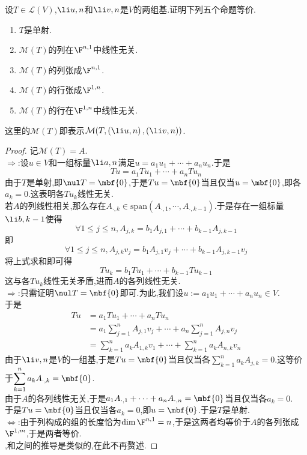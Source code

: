 \documentclass{ctexart}
\begin{document}
\begin{problem}[17.]
    设$T\in\mathcal{L}(V)$,$\li u,n$和$\li v,n$是$V$的两组基.证明下列五个命题等价.
    \begin{enumerate}[label=\tbf{(\arabic*)}]
        \item $T$是单射.
        \item $\mathcal{M}(T)$的列在$\F^{n,1}$中线性无关.
        \item $\mathcal{M}(T)$的列张成$\F^{n,1}$.
        \item $\mathcal{M}(T)$的行张成$\F^{1,n}$.
        \item $\mathcal{M}(T)$的行在$\F^{1,n}$中线性无关.
    \end{enumerate}
    这里的$\mathcal{M}(T)$即表示$\mathcal{M}(T,\left(\li u,n\right),\left(\li v,n\right))$.
\end{problem}
\begin{proof}
    记$\mathcal{M}(T)=A$.\\
    $\Rightarrow$:设$u\in V$和一组标量$\li a,n$满足$u=a_1u_1+\cdots+a_nu_n$.于是
    $$Tu=a_1Tu_1+\cdots+a_nTu_n$$
    由于$T$是单射,即$\nul T=\mbf{0}$,于是$Tu=\mbf{0}$当且仅当$u=\mbf{0}$,即各$a_k=0$.这表明各$Tu_k$线性无关.\\
    若$A$的列线性相关,那么存在$A_{\cdot,k}\in\text{span}\left(A_{\cdot,1},\cdots,A_{\cdot,k-1}\right)$.于是存在一组标量$\li b,{k-1}$使得
    $$\forall 1\leqslant j\leqslant n,A_{j,k}=b_1A_{j,1}+\cdots+b_{k-1}A_{j,k-1}$$
    即$$\forall 1\leqslant j\leqslant n,A_{j,k}v_j=b_1A_{j,1}v_j+\cdots+b_{k-1}A_{j,k-1}v_j$$
    将上式求和即可得$$Tu_k=b_1Tu_1+\cdots+b_{k-1}Tu_{k-1}$$
    这与各$Tu_k$线性无关矛盾,进而$A$的各列线性无关.\\
    $\Rightarrow$:只需证明$\nul T=\mbf{0}$即可.为此,我们设$u:=a_1u_1+\cdots+a_nu_n\in V$.\\
    于是
    $$\begin{aligned}
        Tu
        &= a_1Tu_1+\cdots+a_nTu_n \\
        &= a_1\sum_{j=1}^{n}A_{j,1}v_j+\cdots+a_n\sum_{j=1}^{n}A_{j,n}v_j \\
        &= \sum_{k=1}^{n}a_kA_{1,k}v_1+\cdots+\sum_{k=1}^{n}a_kA_{n,k}v_n 
    \end{aligned}$$
    由于$\li v,n$是$V$的一组基,于是$Tu=\mbf{0}$当且仅当各$\displaystyle\sum_{k=1}^{n}a_kA_{j,k}=0$.这等价于$\displaystyle\sum_{k=1}^{n}a_kA_{\cdot,k}=\mbf{0}$.\\
    由于$A$的各列线性无关,于是$a_1A_{\cdot,1}+\cdots+a_nA_{\cdot,n}=\mbf{0}$当且仅当各$a_k=0$.\\
    于是$Tu=\mbf{0}$当且仅当各$a_k=0$,即$u=\mbf{0}$.于是$T$是单射.\\
    $\Leftrightarrow$:由于列构成的组的长度恰为$\dim\F^{n,1}=n$,于是这两者均等价于$A$的各列张成$\F^{1,m}$,于是两者等价.\\
    ,和之间的推导是类似的,在此不再赘述.
\end{proof}
\end{document}
